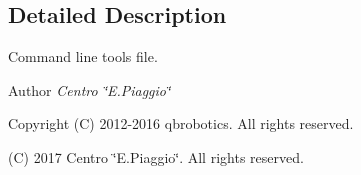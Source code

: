 \subsection{Detailed Description}
Command line tools file. 

\begin{DoxyAuthor}{Author}
{\itshape Centro \char`\"{}\+E.\+Piaggio\char`\"{}} 
\end{DoxyAuthor}
\begin{DoxyCopyright}{Copyright}
(C) 2012-\/2016 qbrobotics. All rights reserved. 

(C) 2017 Centro \char`\"{}\+E.\+Piaggio\char`\"{}. All rights reserved. 
\end{DoxyCopyright}

